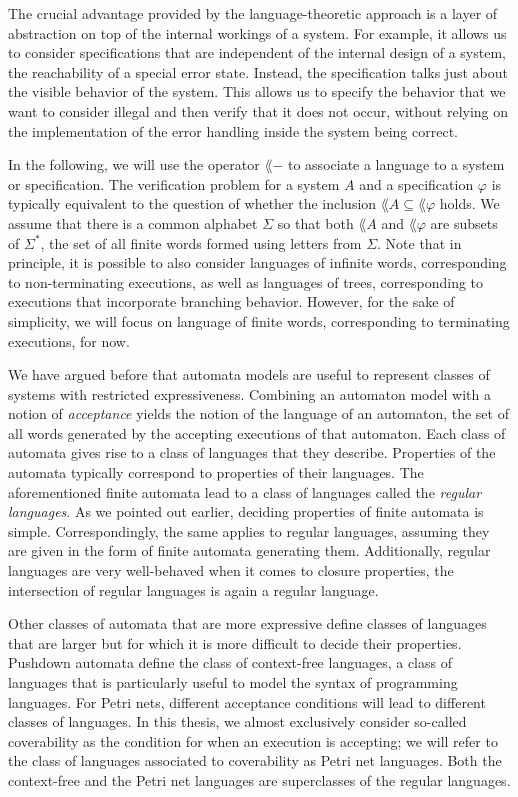 \documentclass[../../diss.tex]{subfiles}
\begin{document}
The crucial advantage provided by the language-theoretic approach is a layer of abstraction on top of the internal workings of a system.
For example, it allows us to consider specifications that are independent of the internal design of a system, \eg the reachability of a special error state.
Instead, the specification talks just about the visible behavior of the system.
This allows us to specify the behavior that we want to consider illegal and then verify that it does not occur, without relying on the implementation of the error handling inside the system being correct.

In the following, we will use the operator $\lang{-}$ to associate a language to a system or specification.
The verification problem for a system $A$ and a specification $\varphi$ is typically equivalent to the question of whether the inclusion $\lang{A} \subseteq \lang{\varphi}$ holds.
We assume that there is a common alphabet $\Sigma$ so that both $\lang{A}$ and $\lang{\varphi}$ are subsets of $\Sigma^*$, the set of all finite words formed using letters from $\Sigma$.
Note that in principle, it is possible to also consider languages of infinite words, corresponding to non-terminating executions, as well as languages of trees, corresponding to executions that incorporate branching behavior.
However, for the sake of simplicity, we will focus on language of finite words, corresponding to terminating executions, for now.

We have argued before that automata models are useful to represent classes of systems with restricted expressiveness.
Combining an automaton model with a notion of \emph{acceptance} yields the notion of the language of an automaton, the set of all words generated by the accepting executions of that automaton.
Each class of automata gives rise to a class of languages that they describe.
Properties of the automata typically correspond to properties of their languages.
The aforementioned finite automata lead to a class of languages called the \emph{regular languages}.
As we pointed out earlier, deciding properties of finite automata is simple.
Correspondingly, the same applies to regular languages, assuming they are given in the form of finite automata generating them.
Additionally, regular languages are very well-behaved when it comes to closure properties, \eg the intersection of regular languages is again a regular language.

Other classes of automata that are more expressive define classes of languages that are larger but for which it is more difficult to decide their properties.
Pushdown automata define the class of context-free languages, a class of languages that is particularly useful to model the syntax of programming languages.
For Petri nets, different acceptance conditions will lead to different classes of languages.
In this thesis, we almost exclusively consider so-called coverability as the condition for when an execution is accepting; we will refer to the class of languages associated to coverability as Petri net languages.
Both the context-free and the Petri net languages are superclasses of the regular languages.
\end{document}
